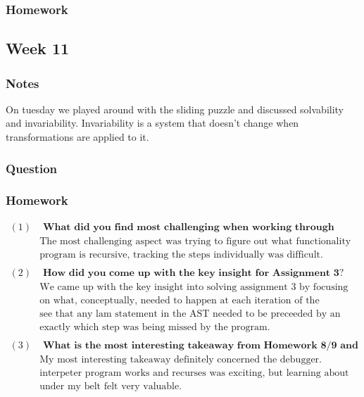 \documentclass{article}
\theoremstyle{theorem}
\theoremstyle{definition}
\theoremstyle{remark}
\begin{document}
\subsubsection*{Homework}

\subsection{Week 11}

\subsubsection*{Notes} On tuesday we played around with the sliding puzzle and discussed solvability and invariability. Invariability is a system that doesn't change when transformations are applied to it.

\subsubsection*{Question} 

\subsubsection*{Homework}

\[
\begin{aligned}
  (1)& \textbf{ What did you find most challenging when working through Homework 8/9 and Assignment 3?}\\
     &  \text{The most challenging aspect was trying to figure out what functionality the program lacked. Because the}\\ 
     &  \text{program is recursive, tracking the steps individually was difficult.}\\
     &\\
  (2)& \textbf{ How did you come up with the key insight for Assignment 3?}\\
     &  \text{We came up with the key insight into solving assignment 3 by focusing less on the the program and more}\\
     &  \text{on what, conceptually, needed to happen at each iteration of the evaluation process. This way, we could}\\
     &  \text{see that any lam statement in the AST needed to be preceeded by an app statement, and figure out }\\
     &  \text{exactly which step was being missed by the program.}\\
     &\\
  (3)& \textbf{ What is the most interesting takeaway from Homework 8/9 and Assignment 3?}\\
     &  \text{My most interesting takeaway definitely concerned the debugger. Conceptually learning more abot how an}\\
     &  \text{interpeter program works and recurses was exciting, but learning about another tool and getting it}\\
     &  \text{under my belt felt very valuable.}\\
\end{aligned}
\]
\end{document}

